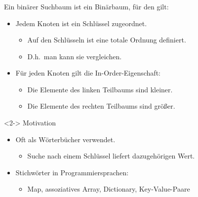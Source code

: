 \begin{frame}
\frametitle{\insertsection}
\begin{definition}
Ein \alert{binärer Suchbaum} ist ein Binärbaum, für den gilt:
\begin{itemize}
	\item Jedem Knoten ist ein \alert{Schlüssel} zugeordnet.
	\begin{itemize}
		\item Auf den Schlüsseln ist eine \alert{totale Ordnung} definiert.
		\item D.h.\ man kann sie vergleichen.
	\end{itemize}
	\item Für jeden Knoten gilt die \alert{In-Order-Eigenschaft}:
	\begin{itemize}
		\item Die Elemente des linken Teilbaums sind kleiner.
		\item Die Elemente des rechten Teilbaums sind größer.
	\end{itemize}
\end{itemize}
\end{definition}
\begin{block}<2->
{Motivation}
\begin{itemize}
	\item Oft als \alert{Wörterbücher} verwendet.
	\begin{itemize}
		\item Suche nach einem \alert{Schlüssel} liefert dazugehörigen \alert{Wert}.
	\end{itemize}
	\item Stichwörter in Programmiersprachen:
	\begin{itemize}
		\item Map, assoziatives Array, Dictionary, Key-Value-Paare
	\end{itemize}
\end{itemize}
\end{block}
\end{frame}


